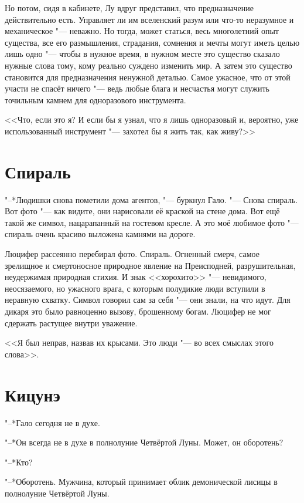 Но потом, сидя в кабинете, Лу вдруг представил, что предназначение действительно есть.
Управляет ли им вселенский разум или что-то неразумное и механическое "--- неважно.
Но тогда, может статься, весь многолетний опыт существа, все его размышления, страдания, сомнения и мечты могут иметь целью лишь одно "--- чтобы в нужное время, в нужном месте это существо сказало нужные слова тому, кому реально суждено изменить мир.
А затем это существо становится для предназначения ненужной деталью.
Самое ужасное, что от этой участи не спасёт ничего "--- ведь любые блага и несчастья могут служить точильным камнем для одноразового инструмента.

<<Что, если это я?
И если бы я узнал, что я лишь одноразовый и, вероятно, уже использованный инструмент "--- захотел бы я жить так, как живу?>>

\section{Спираль}

"--*Людишки снова пометили дома агентов, "--- буркнул Гало.
"--- Снова спираль.
Вот фото "--- как видите, они нарисовали её краской на стене дома.
Вот ещё такой же символ, нацарапанный на гостевом кресле.
А это моё любимое фото "--- спираль очень красиво выложена камнями на дороге.

Люцифер рассеянно перебирал фото.
Спираль.
Огненный смерч, самое зрелищное и смертоносное природное явление на Преисподней, разрушительная, неудержимая природная стихия.
И знак <<хорохито>> "--- невидимого, неосязаемого, но ужасного врага, с которым полудикие люди вступили в неравную схватку.
Символ говорил сам за себя "--- они знали, на что идут.
Для дикаря это было равноценно вызову, брошенному богам.
Люцифер не мог сдержать растущее внутри уважение.

<<Я был неправ, назвав их крысами.
Это люди "--- во всех смыслах этого слова>>.

\section{Кицунэ}

"--*Гало сегодня не в духе.

"--*Он всегда не в духе в полнолуние Четвёртой Луны.
Может, он оборотень?

"--*Кто?

"--*Оборотень.
Мужчина, который принимает облик демонической лисицы в полнолуние Четвёртой Луны.

